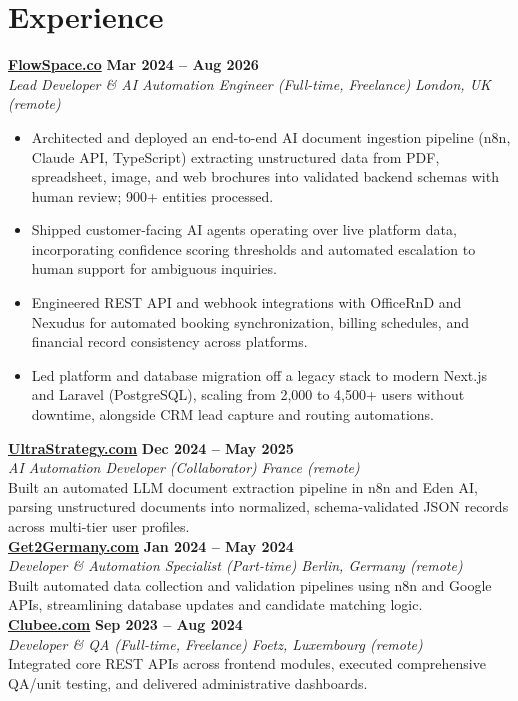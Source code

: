 \documentclass[a4paper,10pt]{article}
\newcommand{\role}[4]{%
  \textbf{#1} \hfill \textbf{#2}\\[1pt]%
  \textit{#3} \hfill \textit{#4}\\[2pt]%
}
\begin{document}
\section{Experience}

\role{\href{https://flowspace.co}{FlowSpace.co}}{Mar 2024 -- Aug 2026}{Lead Developer \& AI Automation Engineer (Full-time, Freelance)}{London, UK (remote)}
\begin{itemize}
  \item Architected and deployed an end-to-end AI document ingestion pipeline (n8n, Claude API, TypeScript) extracting unstructured data from PDF, spreadsheet, image, and web brochures into validated backend schemas with human review; 900+ entities processed.
  \item Shipped customer-facing AI agents operating over live platform data, incorporating confidence scoring thresholds and automated escalation to human support for ambiguous inquiries.
  \item Engineered REST API and webhook integrations with OfficeRnD and Nexudus for automated booking synchronization, billing schedules, and financial record consistency across platforms.
  \item Led platform and database migration off a legacy stack to modern Next.js and Laravel (PostgreSQL), scaling from 2,000 to 4,500+ users without downtime, alongside CRM lead capture and routing automations.
\end{itemize}

\role{\href{https://ultrastrategy.com}{UltraStrategy.com}}{Dec 2024 -- May 2025}{AI Automation Developer (Collaborator)}{France (remote)}
Built an automated LLM document extraction pipeline in n8n and Eden AI, parsing unstructured documents into normalized, schema-validated JSON records across multi-tier user profiles.\\[1pt]

\role{\href{https://get2germany.com}{Get2Germany.com}}{Jan 2024 -- May 2024}{Developer \& Automation Specialist (Part-time)}{Berlin, Germany (remote)}
Built automated data collection and validation pipelines using n8n and Google APIs, streamlining database updates and candidate matching logic.\\[1pt]

\role{\href{https://clubee.com}{Clubee.com}}{Sep 2023 -- Aug 2024}{Developer \& QA (Full-time, Freelance)}{Foetz, Luxembourg (remote)}
Integrated core REST APIs across frontend modules, executed comprehensive QA/unit testing, and delivered administrative dashboards.
\end{document}
